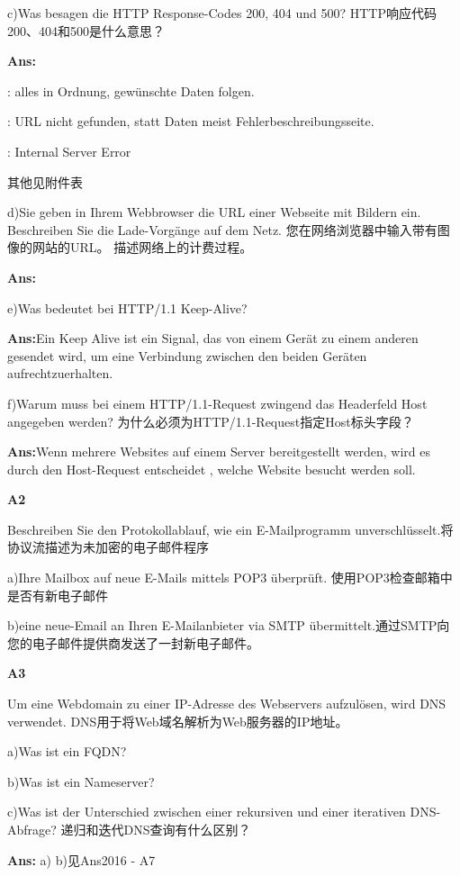 \documentclass[fleqn]{article}
\begin{document}
c)Was besagen die HTTP Response-Codes 200, 404 und 500? HTTP响应代码200、404和500是什么意思？

\textbf{Ans:}

\indent{}: alles in Ordnung, gewünschte Daten folgen.

\indent{}: URL nicht gefunden, statt Daten meist Fehlerbeschreibungsseite.

\indent{}: Internal Server Error

其他见附件表

d)Sie geben in Ihrem Webbrowser die URL einer Webseite mit Bildern ein. Beschreiben Sie die Lade-Vorgänge auf dem Netz. 
您在网络浏览器中输入带有图像的网站的URL。 描述网络上的计费过程。

\textbf{Ans:}

e)Was bedeutet bei HTTP/1.1 Keep-Alive? 

\textbf{Ans:}Ein Keep Alive ist ein Signal, das von einem Gerät zu einem anderen gesendet wird, um eine Verbindung zwischen den beiden Geräten aufrechtzuerhalten. 

f)Warum  muss  bei  einem  HTTP/1.1-Request zwingend  das  Headerfeld  Host  angegeben werden? 
为什么必须为HTTP/1.1-Request指定Host标头字段？

\textbf{Ans:}Wenn mehrere Websites auf einem Server bereitgestellt werden, wird es durch den Host-Request entscheidet , welche Website  besucht werden soll.

\noindent\textbf{A2}

Beschreiben Sie den Protokollablauf, wie ein E-Mailprogramm unverschlüsselt.将协议流描述为未加密的电子邮件程序 

a)Ihre Mailbox auf neue E-Mails mittels POP3 überprüft. 使用POP3检查邮箱中是否有新电子邮件

b)eine neue-Email an Ihren E-Mailanbieter via SMTP übermittelt.通过SMTP向您的电子邮件提供商发送了一封新电子邮件。

\noindent\textbf{A3}

Um  eine  Webdomain  zu  einer  IP-Adresse  des Webservers aufzulösen, wird DNS verwendet. 
DNS用于将Web域名解析为Web服务器的IP地址。

a)Was ist ein FQDN? 

b)Was ist ein Nameserver? 

c)Was  ist  der  Unterschied  zwischen  einer rekursiven und einer iterativen DNS-Abfrage?
递归和迭代DNS查询有什么区别？

\textbf{Ans:} a) b)见Ans2016 - A7
\end{document}
